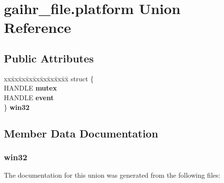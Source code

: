 \hypertarget{uniongaihr__file_8platform}{}\section{gaihr\+\_\+file.\+platform Union Reference}
\label{uniongaihr__file_8platform}
\subsection*{Public Attributes}
\begin{DoxyCompactItemize}
\item 
\mbox{\label{uniongaihr__file_8platform_a9c4f88f706dedde3bc0ebb66e34963e5}} 
\begin{tabbing}
xx\=xx\=xx\=xx\=xx\=xx\=xx\=xx\=xx\=\kill
struct \{\\
\mbox{\label{structgaihr__file_1_1_0D0_1_1_0D1_abd67073f9e6f24b8e2b2f04830dcf26a}} 
HANDLE {\bfseries mutex}\\
\mbox{\label{structgaihr__file_1_1_0D0_1_1_0D1_a2b78d69604475cbeaa4fe29423b29523}} 
HANDLE {\bfseries event}\\
\} {\bfseries win32}\\

\end{tabbing}\end{DoxyCompactItemize}


\subsection{Member Data Documentation}
\mbox{\label{uniongaihr__file_8platform_a9c4f88f706dedde3bc0ebb66e34963e5}} 
\subsubsection{\texorpdfstring{win32}{win32}}
{\footnotesize\ttfamily }



The documentation for this union was generated from the following files\+: